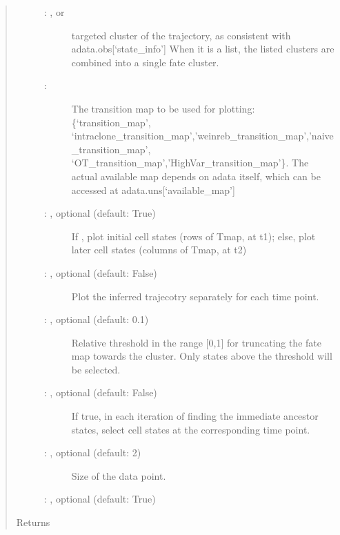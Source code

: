 \documentclass[letterpaper,10pt,english]{sphinxmanual}
\begin{document}
\begin{fulllineitems}
\begin{quote}
\begin{description}
\begin{description}
\item[{ : , or }] \leavevmode
targeted cluster of the trajectory, as consistent with adata.obs{[}‘state\_info’{]}
When it is a list, the listed clusters are combined into a single fate cluster.

\item[{ : }] \leavevmode
The transition map to be used for plotting: \{‘transition\_map’,
‘intraclone\_transition\_map’,’weinreb\_transition\_map’,’naive\_transition\_map’,
‘OT\_transition\_map’,’HighVar\_transition\_map’\}. The actual available
map depends on adata itself, which can be accessed at adata.uns{[}‘available\_map’{]}

\item[{ : , optional (default: True)}] \leavevmode
If , plot initial cell states (rows of Tmap, at t1);
else, plot later cell states (columns of Tmap, at t2)

\item[{ : , optional (default: False)}] \leavevmode
Plot the inferred trajecotry separately for each time point.

\item[{ : , optional (default: 0.1)}] \leavevmode
Relative threshold in the range {[}0,1{]} for truncating the fate map
towards the cluster. Only states above the threshold will be selected.

\item[{ : , optional (default: False)}] \leavevmode
If true, in each iteration of finding the immediate ancestor states, select cell states
at the corresponding time point.

\item[{ : , optional (default: 2)}] \leavevmode
Size of the data point.

\item[{ : , optional (default: True)}] \leavevmode


\end{description}

\item[{Returns}] \leavevmode
{}

\end{description}\end{quote}

\end{fulllineitems}
\end{document}
